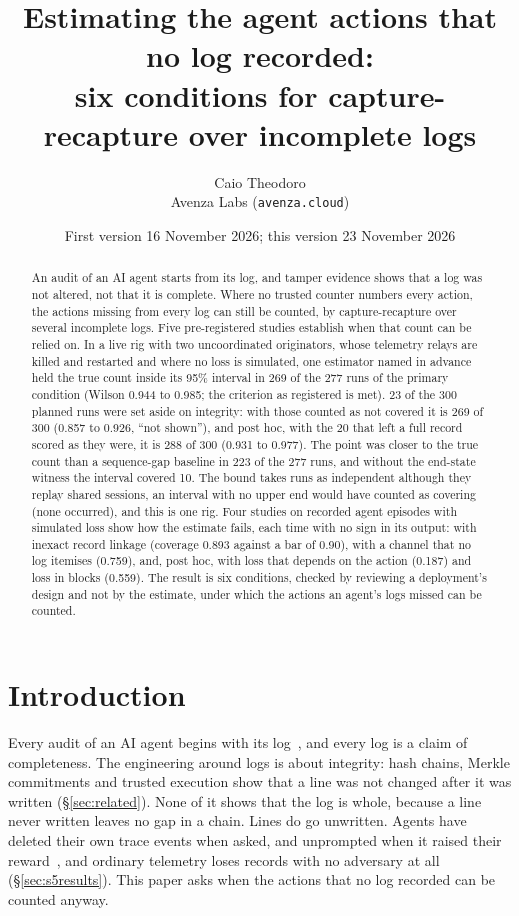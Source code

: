 \documentclass[11pt]{article}
\title{Estimating the agent actions that no log recorded:\\six conditions for capture-recapture over incomplete logs}
\author{Caio Theodoro\\\small Avenza Labs (\texttt{avenza.cloud})}
\date{First version 16 November 2026; this version 23 November 2026}
\begin{document}
\maketitle

\begin{abstract}
An audit of an AI agent starts from its log, and tamper evidence shows that a log was
not altered, not that it is complete. Where no trusted counter numbers every action, the
actions missing from every log can still be counted, by capture-recapture over several
incomplete logs. Five pre-registered studies establish when that count can be relied on.
In a live rig with two uncoordinated originators, whose telemetry relays are killed and
restarted and where no loss is simulated, one estimator named in advance held the true
count inside its 95\% interval in 269 of the 277 runs of the primary condition (Wilson
0.944 to 0.985; the criterion as registered is met). 23 of the 300 planned runs were set
aside on integrity: with those counted as not covered it is 269 of 300 (0.857 to 0.926,
``not shown''), and post hoc, with the 20 that left a full record scored as they were, it
is 288 of 300 (0.931 to 0.977). The point was closer to the true count than a
sequence-gap baseline in 223 of the 277 runs, and without the end-state witness the
interval covered 10. The bound takes runs as independent although they replay shared
sessions, an interval with no upper end would have counted as covering (none occurred),
and this is one rig. Four studies on recorded agent episodes with simulated loss show
how the estimate fails, each time with no sign in its output: with inexact record
linkage (coverage 0.893 against a bar of 0.90), with a channel that no log itemises
(0.759), and, post hoc, with loss that depends on the action (0.187) and loss in blocks
(0.559). The result is six conditions, checked by reviewing a deployment's design and
not by the estimate, under which the actions an agent's logs missed can be counted.
\end{abstract}

\section{Introduction}
\label{sec:question}

Every audit of an AI agent begins with its log~\citep{euaiact}, and every log is a claim
of completeness. The engineering around logs is about integrity: hash chains, Merkle
commitments and trusted execution show that a line was not changed after it was written
(\S\ref{sec:related}). None of it shows that the log is whole, because a line never
written leaves no gap in a chain. Lines do go unwritten. Agents have deleted their own
trace events when asked, and unprompted when it raised their
reward~\citep{qin2026tamper}, and ordinary telemetry loses records with no adversary at
all (\S\ref{sec:s5results}). This paper asks when the actions that no log recorded can
be counted anyway.
\end{document}
